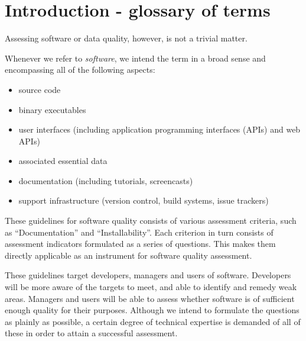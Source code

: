 \documentclass[a4paper,11pt]{article}
\begin{document}
\section{Introduction - glossary of terms}

Assessing software or data quality, however, is not a trivial matter. 

Whenever we refer to \emph{software}, we intend the term in a broad sense and
encompassing all of the following aspects:
\begin{itemize}
    \item source code
    \item binary executables
    \item user interfaces (including application programming interfaces (APIs) and web APIs)
    \item associated essential data
%
%
%
    \item documentation (including tutorials, screencasts)
    \item support infrastructure (version control, build systems, issue trackers)
\end{itemize}

These guidelines for software quality consists of various assessment
criteria, such as ``Documentation'' and ``Installability''. Each criterion in turn
consists of assessment indicators formulated as a series of questions. This
makes them directly applicable as an instrument for software quality
assessment. 

These guidelines target developers, managers and users of software.
Developers will be more aware of the targets to meet, and able to identify and
remedy weak areas. Managers and users will be able to assess whether software
is of sufficient enough quality for their purposes. Although we intend to
formulate the questions as plainly as possible, a certain degree of technical
expertise is demanded of all of these in order to attain a successful
assessment.
\end{document}
